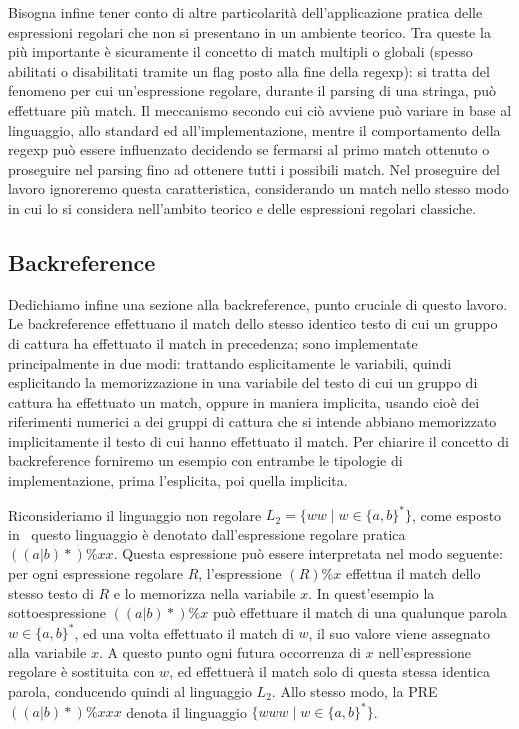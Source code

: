 Bisogna infine tener conto di altre particolarità dell'applicazione pratica delle espressioni regolari che non si presentano in un ambiente teorico. Tra queste la più importante è sicuramente il concetto di match multipli o globali (spesso abilitati o disabilitati tramite un flag posto alla fine della regexp): si tratta del fenomeno per cui un'espressione regolare, durante il parsing di una stringa, può effettuare più match. Il meccanismo secondo cui ciò avviene può variare in base al linguaggio, allo standard ed all'implementazione, mentre il comportamento della regexp può essere influenzato decidendo se fermarsi al primo match ottenuto o proseguire nel parsing fino ad ottenere tutti i possibili match. Nel proseguire del lavoro ignoreremo questa caratteristica, considerando un match nello stesso modo in cui lo si considera nell'ambito teorico e delle espressioni regolari classiche.

\subsection{Backreference}
\label{sec:backreference}
Dedichiamo infine una sezione alla backreference, punto cruciale di questo lavoro. Le backreference effettuano il match dello stesso identico testo di cui un gruppo di cattura ha effettuato il match in precedenza; sono implementate principalmente in due modi: trattando esplicitamente le variabili, quindi esplicitando la memorizzazione in una variabile del testo di cui un gruppo di cattura ha effettuato un match, oppure in maniera implicita, usando cioè dei riferimenti numerici a dei gruppi di cattura che si intende abbiano memorizzato implicitamente il testo di cui hanno effettuato il match. Per chiarire il concetto di backreference forniremo un esempio con entrambe le tipologie di implementazione, prima l'esplicita, poi quella implicita.

Riconsideriamo il linguaggio non regolare $L_2 = \{ww \mid w \in \{a, b\}^*\}$, come esposto in~\cite{freydenberger:pre} questo linguaggio è denotato dall'espressione regolare pratica $((a \vert b)*)\%x x$. Questa espressione può essere interpretata nel modo seguente: per ogni espressione regolare $R$, l'espressione $(R)\%x$ effettua il match dello stesso testo di $R$ e lo memorizza nella variabile $x$. In quest'esempio la sottoespressione $((a \vert b)*)\%x$ può effettuare il match di una qualunque parola $w \in \{a, b\}^*$, ed una volta effettuato il match di $w$, il suo valore viene assegnato alla variabile $x$. A questo punto ogni futura occorrenza di $x$ nell'espressione regolare è sostituita con $w$, ed effettuerà il match solo di questa stessa identica parola, conducendo quindi al linguaggio $L_2$. Allo stesso modo, la PRE $((a \vert b)*)\%xxx$ denota il linguaggio $\{www \mid w \in \{a, b\}^*\}$.


